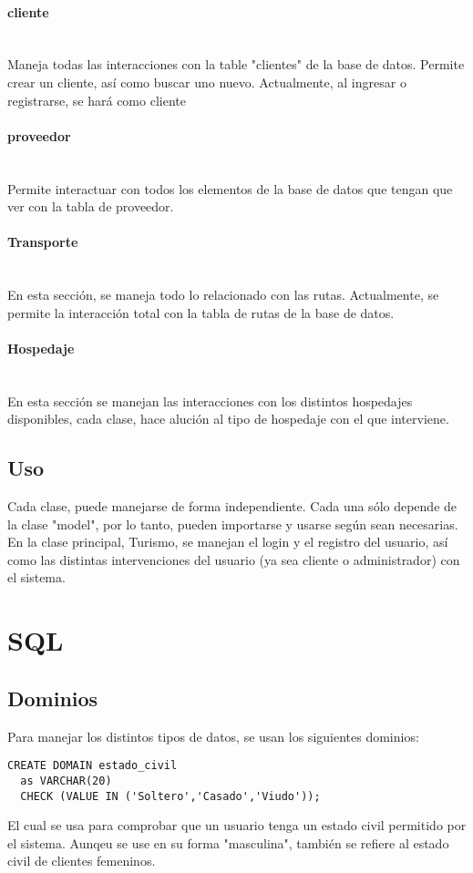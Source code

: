 \documentclass{article}
\begin{document}
        \paragraph{cliente}\mbox{}\\
        Maneja todas las interacciones con la table "clientes" de la base de datos. Permite crear un cliente, así como buscar uno nuevo. Actualmente, al ingresar o registrarse, se hará como cliente
        \paragraph{proveedor}\mbox{}\\
        Permite interactuar con todos los elementos de la base de datos que tengan que ver con la tabla de proveedor. 
        \paragraph{Transporte}\mbox{}\\
        En esta sección, se maneja todo lo relacionado con las rutas. Actualmente, se permite la interacción total con la tabla de rutas de la base de datos.
        \paragraph{Hospedaje}\mbox{}\\
        En esta sección se manejan las interacciones con los distintos hospedajes disponibles, cada clase, hace alución al tipo de hospedaje con el que interviene.
        
        
\subsection{Uso}
Cada clase, puede manejarse de forma independiente. Cada una sólo depende de la clase "model", por lo tanto, pueden importarse y usarse según sean necesarias.
En la clase principal, Turismo, se manejan el login y el registro del usuario, así como las distintas intervenciones del usuario (ya sea cliente o administrador) con el sistema. 


\section{SQL}
\subsection{Dominios}
Para manejar los distintos tipos de datos, se usan los siguientes dominios:
\begin{lstlisting}
CREATE DOMAIN estado_civil
  as VARCHAR(20)
  CHECK (VALUE IN ('Soltero','Casado','Viudo'));
\end{lstlisting}
El cual se usa para comprobar que un usuario tenga un estado civil permitido por el sistema. Aunqeu se use en su forma "masculina", también se refiere al estado civil de clientes femeninos.
\end{document}
